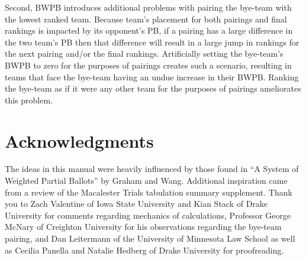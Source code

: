 \documentclass{article}
\begin{document}
Second, BWPB introduces additional problems with pairing the bye-team with the lowest ranked team. Because team's placement for both pairings and final rankings is impacted by its opponent's PB, if a pairing has a large difference in the two team's PB then that difference will result in a large jump in rankings for the next pairing and/or the final rankings. Artificially setting the bye-team's BWPB to zero for the purposes of pairings creates such a scenario, resulting in teams that face the bye-team having an undue increase in their BWPB. Ranking the bye-team as if it were any other team for the purposes of pairings ameliorates this problem.
\section{Acknowledgments}
The ideas in this manual were heavily influenced by those found in ``A System of Weighted Partial Ballots'' by Graham and Wang.  Additional inspiration came from a review of the Macalester Trials tabulation summary supplement.  Thank you to Zach Valentine of Iowa State University and Kian Stack of Drake University for comments regarding mechanics of calculations, Professor George McNary of Creighton University for his observations regarding the bye-team pairing, and Dan Leitermann of the University of Minnesota Law School as well as Cecilia Panella and Natalie Hedberg of Drake University for proofreading.
\end{document}
